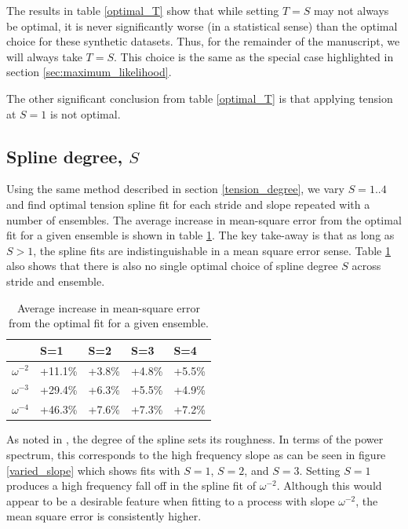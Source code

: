 \documentclass[10pt,journal]{IEEEtran}
\begin{document}
The results in table \ref{optimal_T} show that while setting $T=S$ may not always be optimal, it is never significantly worse (in a statistical sense) than the optimal choice for these synthetic datasets. Thus, for the remainder of the manuscript, we will always take $T=S$. This choice is the same as the special case highlighted in section \ref{sec:maximum_likelihood}.

The other significant conclusion from table \ref{optimal_T} is that applying tension at $S=1$ is not optimal.

\subsection{Spline degree, $S$} \label{spline_degree}

Using the same method described in section \ref{tension_degree}, we vary $S=1..4$ and find optimal tension spline fit for each stride and slope repeated with a number of ensembles. The average increase in mean-square error from the optimal fit for a given ensemble is shown in table \ref{optimal_S}. The key take-away is that as long as $S > 1$, the spline fits are indistinguishable in a mean square error sense. Table \ref{optimal_S} also shows that there is also no single optimal choice of spline degree $S$ across stride and ensemble.

\begin{table}[ht]
\caption{Average increase in mean-square error from the optimal fit for a given ensemble.}
\label{optimal_S}
\centering
\begin{tabular}{r | llll}  & S=1 & S=2 & S=3 & S=4 \\ \hline \hline 
$\omega^{-2}$ & +11.1\% & +3.8\% & +4.8\% & +5.5\%  \\ 
$\omega^{-3}$ & +29.4\% & +6.3\% & +5.5\% & +4.9\%  \\ 
$\omega^{-4}$ & +46.3\% & +7.6\% & +7.3\% & +7.2\%  \\ 
\end{tabular} 
\end{table}

As noted in \cite{craven1979-nm}, the degree of the spline sets its roughness. In terms of the power spectrum, this corresponds to the high frequency slope as can be seen in figure \ref{varied_slope} which shows fits with $S=1$, $S=2$, and $S=3$. Setting $S=1$ produces a high frequency fall off in the spline fit of $\omega^{-2}$. Although this would appear to be a desirable feature when fitting to a process with slope $\omega^{-2}$, the mean square error is consistently higher.
\end{document}
